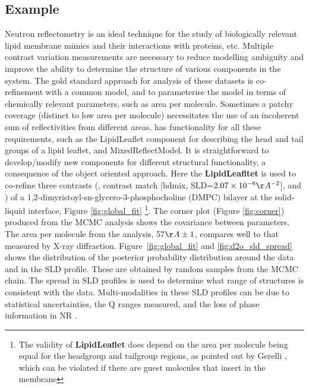 \documentclass[12pt]{article}
\begin{document}
\subsection*{Example}
Neutron reflectometry is an ideal technique for the study of biologically relevant lipid membrane mimics and their interactions with proteins, etc. Multiple contrast variation measurements are necessary to reduce modelling ambiguity and improve the ability to determine the structure of various components in the system. The gold standard approach for analysis of these datasets is co-refinement with a common model, and to parameterise the model in terms of chemically relevant parameters, such as area per molecule. Sometimes a patchy coverage (distinct to low area per molecule) necessitates the use of an incoherent sum of reflectivities from different areas.  has functionality for all these requirements, such as the LipidLeaflet component for describing the head and tail groups of a lipid leaflet, and MixedReflectModel. It is straightforward to develop/modify new components for different structural functionality, a consequence of the object oriented approach. Here the \textbf{LipidLeafltet} is used to co-refine three contrasts (,  contrast match [hdmix, SLD=$2.07\times10^{-6}\AA^{-2}$], and ) of a 1,2-dimyristoyl-sn-glycero-3-phosphocholine (DMPC) bilayer at the solid-liquid interface, Figure \ref{fig:global_fit} \footnote{The validity of \textbf{LipidLeaflet} does depend on the area per molecule being equal for the headgroup and tailgroup regions, as pointed out by Gerelli \cite{Gerelli2016}, which can be violated if there are guest molecules that insert in the membrane}. The corner plot (Figure \ref{fig:corner}) produced from the MCMC analysis shows the covariance between parameters. The area per molecule from the analysis, 57$\AA\pm1$, compares well to that measured by X-ray diffraction. Figure~\ref{fig:global_fit} and \ref{fig:d2o_sld_spread} shows the distribution of the posterior probability distribution around the data and in the SLD profile. These are obtained by random samples from the MCMC chain. The spread in SLD profiles is used to determine what range of structures is consistent with the data. Multi-modalities in these SLD profiles can be due to statistical uncertainties, the Q ranges measured, and the loss of phase information in NR \cite{Majkrzak1999, Heinrich2009}.
\end{document}
